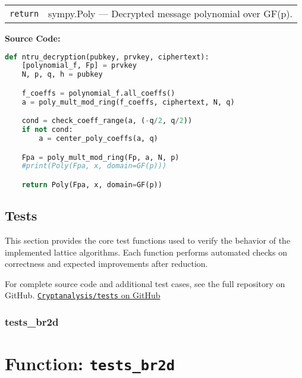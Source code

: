 \documentclass[a4paper,12pt]{article}
\begin{document}
\begin{tabular}{p{3cm} p{11cm}}
\texttt{return} & sympy.Poly — Decrypted message polynomial over GF(p). \\
\end{tabular}

\vspace{1em}
\textbf{Source Code:}

\begin{lstlisting}[language=Python]
def ntru_decryption(pubkey, prvkey, ciphertext):
    [polynomial_f, Fp] = prvkey
    N, p, q, h = pubkey

    f_coeffs = polynomial_f.all_coeffs()
    a = poly_mult_mod_ring(f_coeffs, ciphertext, N, q)

    cond = check_coeff_range(a, (-q/2, q/2))
    if not cond:
        a = center_poly_coeffs(a, q)

    Fpa = poly_mult_mod_ring(Fp, a, N, p)
    #print(Poly(Fpa, x, domain=GF(p)))

    return Poly(Fpa, x, domain=GF(p))
\end{lstlisting}






\subsection{Tests}

This section provides the core test functions used to verify the behavior of the implemented lattice algorithms.  
Each function performs automated checks on correctness and expected improvements after reduction.

For complete source code and additional test cases, see the full repository on GitHub. 
\noindent
\href{https://github.com/SanyaKor/Cryptanalysis/tree/main/tests}{\texttt{Cryptanalysis/tests} on GitHub}
\\



\subsubsection{tests\_br2d}

\section*{Function: \texttt{tests\_br2d}}
\end{document}

